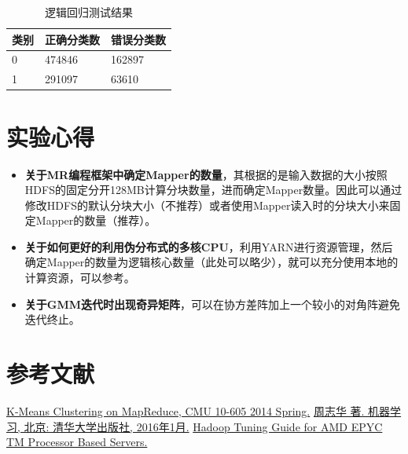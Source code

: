 \documentclass{ML}
\begin{document}
\begin{table}[htb]
    \centering
    \begin{tabular}{|l|l|l|}
    \hline
    类别 & 正确分类数  & 错误分类数  \\ \hline
    0  & 474846 & 162897 \\ \hline
    1  & 291097 & 63610  \\ \hline
    \end{tabular}
    \caption{逻辑回归测试结果}\label{tab:lr}
\end{table}

\section{实验心得}
\begin{itemize}
    \item \textbf{关于MR编程框架中确定Mapper的数量}，其根据的是输入数据的大小按照HDFS的固定分开128MB计算分块数量，进而确定Mapper数量。因此可以通过修改HDFS的默认分块大小（不推荐）或者使用Mapper读入时的分块大小来固定Mapper的数量（推荐）。
    \item \textbf{关于如何更好的利用伪分布式的多核CPU}，利用YARN进行资源管理，然后确定Mapper的数量为逻辑核心数量（此处可以略少），就可以充分使用本地的计算资源，可以参考\cite{amd}。
    \item \textbf{关于GMM迭代时出现奇异矩阵}，可以在协方差阵加上一个较小的对角阵避免迭代终止。
\end{itemize}
\appendix

\section{参考文献}
\begin{thebibliography}{20}
     \href{http://curtis.ml.cmu.edu/w/courses/index.php/Syllabus_for_Machine_Learning_with_Large_Datasets_10-605_in_Spring_2014}{K-Means Clustering on MapReduce, CMU 10-605 2014 Spring.}
     \href{http://cs.nju.edu.cn/zhouzh/zhouzh.files/publication/MLbook2016.htm}{周志华 著. 机器学习, 北京: 清华大学出版社, 2016年1月.}
     \href{https://developer.amd.com/wp-content/resources/56419.PDF}{Hadoop Tuning Guide for AMD EPYC TM Processor Based Servers.}
\end{thebibliography}
\end{document}
